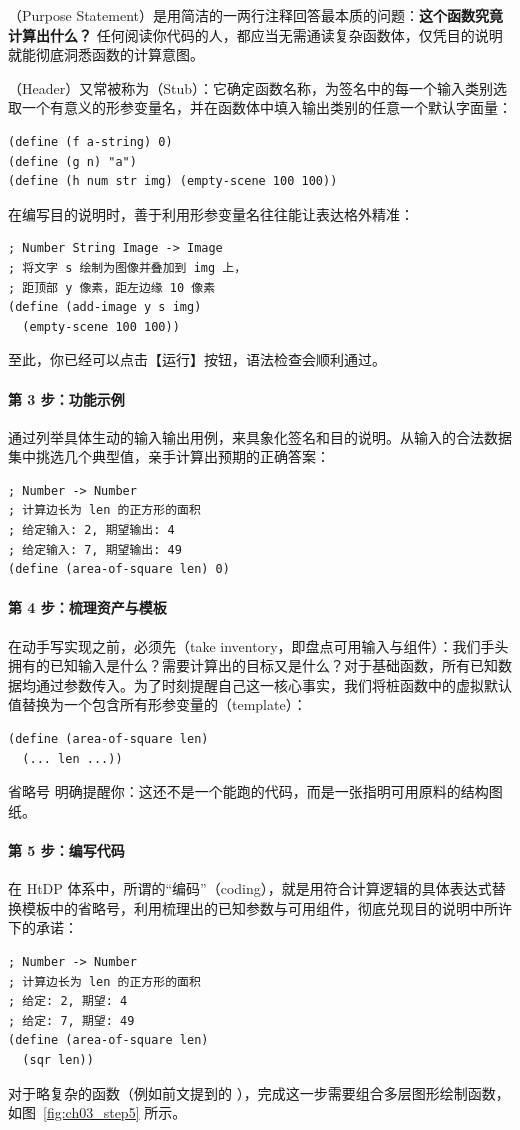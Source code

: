 （Purpose Statement）是用简洁的一两行注释回答最本质的问题：\textbf{这个函数究竟计算出什么？} 任何阅读你代码的人，都应当无需通读复杂函数体，仅凭目的说明就能彻底洞悉函数的计算意图。

（Header）又常被称为（Stub）：它确定函数名称，为签名中的每一个输入类别选取一个有意义的形参变量名，并在函数体中填入输出类别的任意一个默认字面量：
\begin{lstlisting}[language=BSL]
(define (f a-string) 0)
(define (g n) "a")
(define (h num str img) (empty-scene 100 100))
\end{lstlisting}
在编写目的说明时，善于利用形参变量名往往能让表达格外精准：
\begin{lstlisting}[language=BSL]
; Number String Image -> Image
; 将文字 s 绘制为图像并叠加到 img 上，
; 距顶部 y 像素，距左边缘 10 像素
(define (add-image y s img)
  (empty-scene 100 100))
\end{lstlisting}
至此，你已经可以点击【运行】按钮，语法检查会顺利通过。

\paragraph{第 3 步：功能示例}
通过列举具体生动的输入输出用例，来具象化签名和目的说明。从输入的合法数据集中挑选几个典型值，亲手计算出预期的正确答案：
\begin{lstlisting}[language=BSL]
; Number -> Number
; 计算边长为 len 的正方形的面积
; 给定输入: 2, 期望输出: 4
; 给定输入: 7, 期望输出: 49
(define (area-of-square len) 0)
\end{lstlisting}

\paragraph{第 4 步：梳理资产与模板}
在动手写实现之前，必须先（take inventory，即盘点可用输入与组件）：我们手头拥有的已知输入是什么？需要计算出的目标又是什么？对于基础函数，所有已知数据均通过参数传入。为了时刻提醒自己这一核心事实，我们将桩函数中的虚拟默认值替换为一个包含所有形参变量的（template）：
\begin{lstlisting}[language=BSL]
(define (area-of-square len)
  (... len ...))
\end{lstlisting}
省略号  明确提醒你：这还不是一个能跑的代码，而是一张指明可用原料的结构图纸。

\paragraph{第 5 步：编写代码}
在 HtDP 体系中，所谓的“编码”（coding），就是用符合计算逻辑的具体表达式替换模板中的省略号，利用梳理出的已知参数与可用组件，彻底兑现目的说明中所许下的承诺：
\begin{lstlisting}[language=BSL]
; Number -> Number
; 计算边长为 len 的正方形的面积
; 给定: 2, 期望: 4
; 给定: 7, 期望: 49
(define (area-of-square len)
  (sqr len))
\end{lstlisting}
对于略复杂的函数（例如前文提到的 ），完成这一步需要组合多层图形绘制函数，如图~\ref{fig:ch03_step5} 所示。

